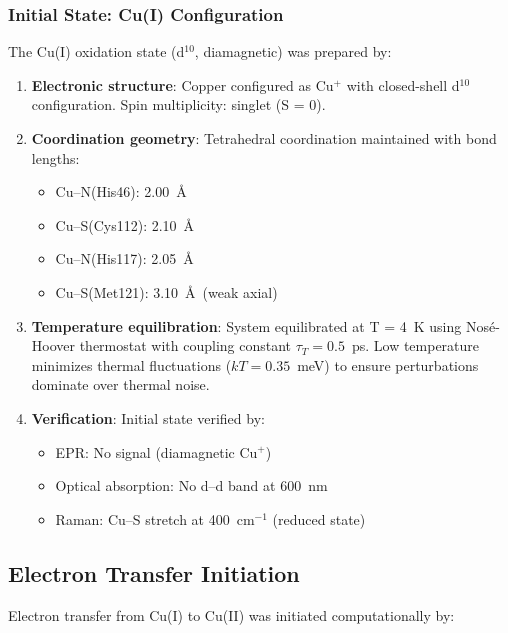 \documentclass[twocolumn,10pt]{article}
\begin{document}
\subsubsection{Initial State: Cu(I) Configuration}

The Cu(I) oxidation state (d$^{10}$, diamagnetic) was prepared by:

\begin{enumerate}
\item \textbf{Electronic structure}: Copper configured as Cu$^+$ with closed-shell 
d$^{10}$ configuration. Spin multiplicity: singlet (S = 0).

\item \textbf{Coordination geometry}: Tetrahedral coordination maintained with 
bond lengths:
\begin{itemize}
\item Cu--N(His46): 2.00~\AA
\item Cu--S(Cys112): 2.10~\AA  
\item Cu--N(His117): 2.05~\AA
\item Cu--S(Met121): 3.10~\AA\ (weak axial)
\end{itemize}

\item \textbf{Temperature equilibration}: System equilibrated at T = 4~K using 
Nosé-Hoover thermostat \cite{Nose1984} with coupling constant $\tau_T = 0.5$~ps. 
Low temperature minimizes thermal fluctuations ($kT = 0.35$~meV) to ensure 
perturbations dominate over thermal noise.

\item \textbf{Verification}: Initial state verified by:
\begin{itemize}
\item EPR: No signal (diamagnetic Cu$^+$)
\item Optical absorption: No d--d band at 600~nm
\item Raman: Cu--S stretch at 400~cm$^{-1}$ (reduced state)
\end{itemize}
\end{enumerate}

\subsection{Electron Transfer Initiation}

Electron transfer from Cu(I) to Cu(II) was initiated computationally by:
\end{document}
